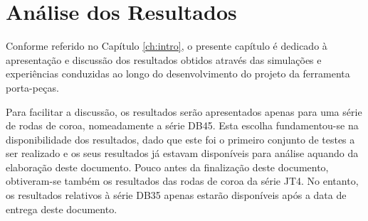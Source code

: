 \chapter{Análise dos Resultados} \label{ch:resultados}
\setlength{\headheight}{13.6pt}
Conforme referido no Capítulo \ref{ch:intro}, o presente capítulo é dedicado à apresentação e discussão dos resultados obtidos através das simulações e experiências conduzidas ao longo do desenvolvimento do projeto da ferramenta porta-peças.
\par
Para facilitar a discussão, os resultados serão apresentados apenas para uma série de rodas de coroa, nomeadamente a série DB45. Esta escolha fundamentou-se na disponibilidade dos resultados, dado que este foi o primeiro conjunto de testes a ser realizado e os seus resultados já estavam disponíveis para análise aquando da elaboração deste documento. Pouco antes da finalização deste documento, obtiveram-se também os resultados das rodas de coroa da série JT4. No entanto, os resultados relativos à série DB35 apenas estarão disponíveis após a data de entrega deste documento.


